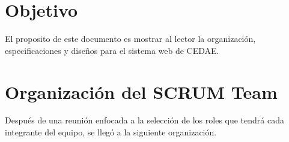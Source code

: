 \documentclass[12pt,letterpaper]{article}
\begin{document}
{\begin{center}
			\par\vspace{3cm}

		\end{center}
		\clearpage
	}

	\newpage
	\tableofcontents
    \newpage

    \newpage
    
    \section{Objetivo}
    El proposito de este documento es mostrar al lector la organización, especificaciones y diseños para el sistema web de CEDAE.

    \section{Organización del SCRUM Team}
    \justify
                Después de una reunión enfocada a la selección de los roles que tendrá cada integrante del equipo, se llegó a la siguiente
                organización.
                \\\\
\end{document}
